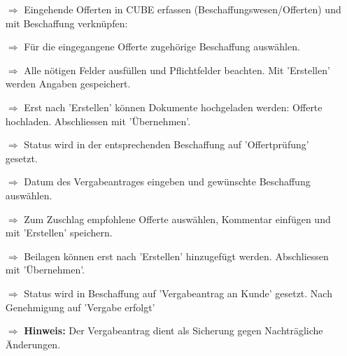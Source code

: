 \documentclass{article}
\begin{document}

\begin{multicols}{2}

\begin{tcolorbox}[colback=blue!5,colframe=blue!40!black,title=(3) Offerte(n) entgegennehmen und prüfen]
\begin{itemize}
  \item[$\Longrightarrow$] Eingehende Offerten in CUBE erfassen (Beschaffungswesen/Offerten) und mit Beschaffung verknüpfen:
	\item[$\Longrightarrow$] Für die eingegangene Offerte zugehörige Beschaffung auswählen.
  \item[$\Longrightarrow$] Alle nötigen Felder ausfüllen und Pflichtfelder beachten. Mit 'Erstellen' werden Angaben gespeichert.
	\item[$\Longrightarrow$] Erst nach 'Erstellen' können Dokumente hochgeladen werden: Offerte hochladen. Abschliessen mit 'Übernehmen'.
	\item[$\Longrightarrow$] Status wird in der entsprechenden Beschaffung auf 'Offertprüfung' gesetzt.
\end{itemize}
\end{tcolorbox}


\begin{tcolorbox}[colback=blue!5,colframe=blue!40!black,title=(4) Vergabeantrag ausfüllen]
\begin{itemize}
  \item[$\Longrightarrow$] Datum des Vergabeantrages eingeben und gewünschte Beschaffung auswählen.
  \item[$\Longrightarrow$] Zum Zuschlag empfohlene Offerte auswählen, Kommentar einfügen und mit 'Erstellen' speichern.
  \item[$\Longrightarrow$] Beilagen können erst nach 'Erstellen' hinzugefügt werden. Abschliessen mit 'Übernehmen'.
	\item[$\Longrightarrow$] Status wird in Beschaffung auf 'Vergabeantrag an Kunde' gesetzt. Nach Genehmigung auf 'Vergabe erfolgt'
	\item[$\Longrightarrow$] \textbf{Hinweis:} Der Vergabeantrag dient als Sicherung gegen Nachträgliche Änderungen.
\end{itemize}
\end{tcolorbox}


\end{multicols}



\end{document}

